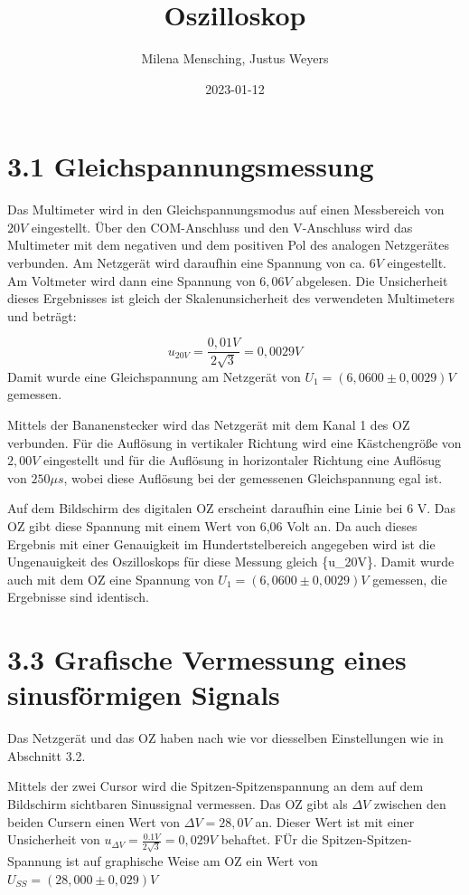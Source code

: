 \documentclass[
  9pt,
]{article}
\title{Oszilloskop}
\author{Milena Mensching, Justus Weyers}
\date{2023-01-12}
\begin{document}
\maketitle

\hypertarget{gleichspannungsmessung}{%
\section{3.1 Gleichspannungsmessung}\label{gleichspannungsmessung}}

Das Multimeter wird in den Gleichspannungsmodus auf einen Messbereich
von \(20V\) eingestellt. Über den COM-Anschluss und den V-Anschluss wird
das Multimeter mit dem negativen und dem positiven Pol des analogen
Netzgerätes verbunden. Am Netzgerät wird daraufhin eine Spannung von ca.
\(6 V\) eingestellt. Am Voltmeter wird dann eine Spannung von \(6,06 V\)
abgelesen. Die Unsicherheit dieses Ergebnisses ist gleich der
Skalenunsicherheit des verwendeten Multimeters und beträgt:

\[u_{20V} = \frac{0,01V}{2\sqrt{3}}=0,0029V\] Damit wurde eine
Gleichspannung am Netzgerät von \(U_1 = (6,0600 \pm 0,0029)V\) gemessen.

Mittels der Bananenstecker wird das Netzgerät mit dem Kanal 1 des OZ
verbunden. Für die Auflösung in vertikaler Richtung wird eine
Kästchengröße von \(2,00 V\) eingestellt und für die Auflösung in
horizontaler Richtung eine Auflösug von \(250\mu s\), wobei diese
Auflösung bei der gemessenen Gleichspannung egal ist.

Auf dem Bildschirm des digitalen OZ erscheint daraufhin eine Linie bei 6
V. Das OZ gibt diese Spannung mit einem Wert von 6,06 Volt an. Da auch
dieses Ergebnis mit einer Genauigkeit im Hundertstelbereich angegeben
wird ist die Ungenauigkeit des Oszilloskops für diese Messung gleich
\{u\_20V\}. Damit wurde auch mit dem OZ eine Spannung von
\(U_1 = (6,0600 \pm 0,0029)V\) gemessen, die Ergebnisse sind identisch.

\hypertarget{grafische-vermessung-eines-sinusfuxf6rmigen-signals}{%
\section{3.3 Grafische Vermessung eines sinusförmigen
Signals}\label{grafische-vermessung-eines-sinusfuxf6rmigen-signals}}

Das Netzgerät und das OZ haben nach wie vor diesselben Einstellungen wie
in Abschnitt 3.2.

Mittels der zwei Cursor wird die Spitzen-Spitzenspannung an dem auf dem
Bildschirm sichtbaren Sinussignal vermessen. Das OZ gibt als
\(\Delta V\) zwischen den beiden Cursern einen Wert von
\(\Delta V = 28,0 V\) an. Dieser Wert ist mit einer Unsicherheit von
\(u_{\Delta V} = \frac{0.1V}{2\sqrt{3}}=0,029 V\) behaftet. FÜr die
Spitzen-Spitzen-Spannung ist auf graphische Weise am OZ ein Wert von
\(U_{SS}=(28,000 \pm 0,029)V\)
\end{document}
